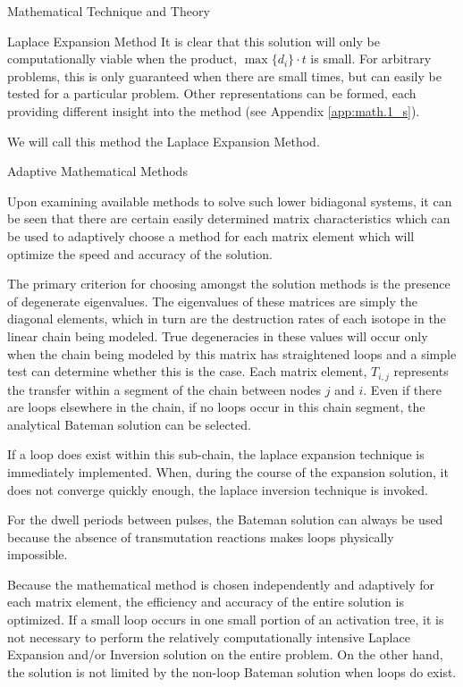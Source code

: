\begin{chapter}{Mathematical Technique and Theory\label{chap:math}}
\begin{section}{Laplace Expansion Method}
    It is clear that this solution will only be computationally viable
    when the product, $\max \{d_i\} \cdot t$ is small.  For arbitrary
    problems, this is only guaranteed when there are small times, but
    can easily be tested for a particular problem.  Other
    representations can be formed, each providing different insight
    into the method (see Appendix \ref{app:math.1_s}).
    
    We will call this method the Laplace Expansion Method.

  \end{section}
  
  \begin{section}{Adaptive Mathematical Methods\label{sec:math.adaptive}}
  
    Upon examining available methods to solve such lower bidiagonal
    systems, it can be seen that there are certain easily determined
    matrix characteristics which can be used to adaptively choose a
    method for each matrix element which will optimize the speed and
    accuracy of the solution.
  
    The primary criterion for choosing amongst the solution methods is
    the presence of degenerate eigenvalues.  The eigenvalues of these
    matrices are simply the diagonal elements, which in turn are the
    destruction rates of each isotope in the linear chain being
    modeled.  True degeneracies in these values will occur only when
    the chain being modeled by this matrix has straightened loops and
    a simple test can determine whether this is the case.  Each matrix
    element, $T_{i,j}$ represents the transfer within a segment of the
    chain between nodes $j$ and $i$.  Even if there are loops
    elsewhere in the chain, if no loops occur in this chain segment,
    the analytical Bateman solution can be selected.
  
    If a loop does exist within this sub-chain, the laplace expansion
    technique is immediately implemented.  When, during the course of
    the expansion solution, it does not converge quickly enough, the
    laplace inversion technique is invoked.
  
    For the dwell periods between pulses, the Bateman solution can
    always be used because the absence of transmutation reactions
    makes loops physically impossible.
  
    Because the mathematical method is chosen independently and
    adaptively for each matrix element, the efficiency and accuracy of
    the entire solution is optimized.  If a small loop occurs in one
    small portion of an activation tree, it is not necessary to
    perform the relatively computationally intensive Laplace Expansion
    and/or Inversion solution on the entire problem.  On the other
    hand, the solution is not limited by the non-loop Bateman solution
    when loops do exist.


\end{section}
\end{chapter}
